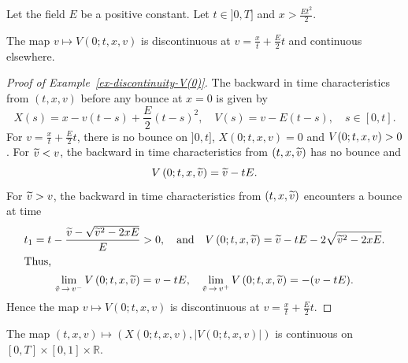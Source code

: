 \documentclass[AHL,Unicode,longabstracts,published]{cedram}
\newcommand{\R}{\mathbb{R}}
\let\oldtilde\tilde
\renewcommand*{\tilde}[1]{\mathchoice{\widetilde{#1}}{\widetilde{#1}}{\oldtilde{#1}}{\oldtilde{#1}}}
\begin{document}
\begin{exam}\label{ex-discontinuity-V(0)}
Let the field $E$ be a positive constant. Let $t\in] 0,T]$ and $x>\frac{Et^2}{2}$.

The map $v \mapsto V(0;t,x,v)$ is discontinuous at $v=\frac{x}{t}+\frac{E}{2}t$ and continuous elsewhere.
\end{exam}

\begin{proof}[{Proof of Example~\ref{ex-discontinuity-V(0)}}]
The backward in time characteristics from $(t,x,v)$ before any bounce at $x=0$ is given by
\[
X(s)= x-v(t-s)+\frac{E}{2}(t-s)^2, \quad V(s)= v-E(t-s), \quad s \in [0,t].
\]
For $v=\frac{x}{t}+\frac{E}{2}t$, there is no bounce on $]0,t]$, $X(0;t,x,v)=0$ and $V(0;t,x,v)\linebreak >0$. For $\tilde{v}<v$, the backward in time characteristics from $(t,x,\tilde{v})$ has no bounce and
\[
V\left(0;t,x,\tilde{v}\right)= \tilde{v}-tE.
\]
For $\tilde{v}>v$, the backward in time characteristics from $(t,x,\tilde{v})$ encounters a bounce at time
\begin{gather*}
t_1=t-\frac{\tilde{v}-\sqrt{\tilde{v}^2-2xE}}{E}>0,\quad \text{and}\quad V\left(0;t,x,\tilde{v}\right) = \tilde{v}-tE-2\sqrt{\tilde{v}^2-2xE}.
\\
\intertext{Thus,}
\lim _{\tilde{v}\,\to\,v^-}V\left(0;t,x,\tilde{v}\right)= v-tE, \quad \lim _{\tilde{v}\,\to\,v^+}V\left(0;t,x,\tilde{v}\right)= -(v-tE).
\end{gather*}
Hence the map $v \mapsto V(0;t,x,v)$ is discontinuous at $v=\tfrac{x}{t}+\tfrac{E}{2}t$. 
\end{proof}


\begin{prop}\label{continuite-valeur-absolueV(0)}
The map $(t,x,v) \mapsto (X(0;t,x,v),|V(0;t,x,v)|)$ is continuous on $[0,T]
\times [0,1] \times \R $.
\end{prop}
\end{document}
